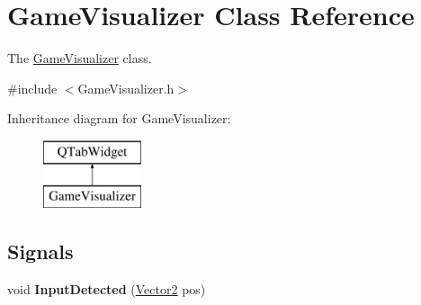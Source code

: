 \hypertarget{classGameVisualizer}{\section{Game\-Visualizer Class Reference}
\label{classGameVisualizer}
}


The \hyperlink{classGameVisualizer}{Game\-Visualizer} class.  




{\ttfamily \#include $<$Game\-Visualizer.\-h$>$}

Inheritance diagram for Game\-Visualizer\-:\begin{figure}[H]
\begin{center}
\leavevmode
\includegraphics[height=2.000000cm]{classGameVisualizer}
\end{center}
\end{figure}
\subsection*{Signals}
\begin{DoxyCompactItemize}
\item 
\hypertarget{classGameVisualizer_abb8ff4568ee3c5ed30cbc2df3d32df84}{void {\bfseries Input\-Detected} (\hyperlink{structVector2}{Vector2} pos)}\label{classGameVisualizer_abb8ff4568ee3c5ed30cbc2df3d32df84}

\end{DoxyCompactItemize}
